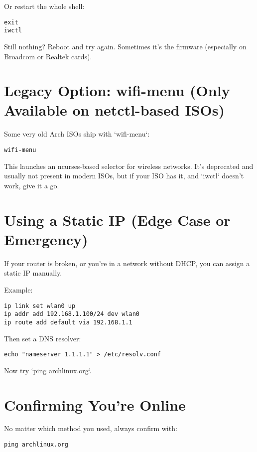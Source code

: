 \documentclass[12pt,openany]{book}
\begin{document}
Or restart the whole shell:

\begin{lstlisting}
exit
iwctl
\end{lstlisting}

Still nothing? Reboot and try again. Sometimes it’s the firmware (especially on Broadcom or Realtek cards).

\section{Legacy Option: wifi-menu (Only Available on netctl-based ISOs)}

Some very old Arch ISOs ship with `wifi-menu`:

\begin{lstlisting}
wifi-menu
\end{lstlisting}

This launches an ncurses-based selector for wireless networks. It’s deprecated and usually not present in modern ISOs, but if your ISO has it, and `iwctl` doesn’t work, give it a go.

\section{Using a Static IP (Edge Case or Emergency)}

If your router is broken, or you’re in a network without DHCP, you can assign a static IP manually.

Example:

\begin{lstlisting}
ip link set wlan0 up
ip addr add 192.168.1.100/24 dev wlan0
ip route add default via 192.168.1.1
\end{lstlisting}

Then set a DNS resolver:

\begin{lstlisting}
echo "nameserver 1.1.1.1" > /etc/resolv.conf
\end{lstlisting}

Now try `ping archlinux.org`.

\section{Confirming You’re Online}

No matter which method you used, always confirm with:

\begin{lstlisting}
ping archlinux.org
\end{lstlisting}
\end{document}
